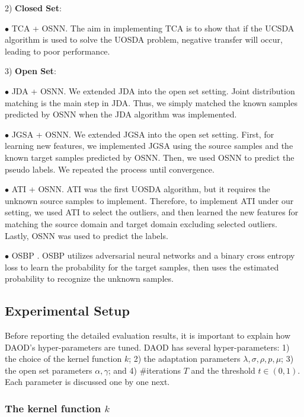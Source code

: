 \documentclass[journal]{IEEEtran}
\begin{document}
2) \textbf{Closed Set}:

$\bullet$ TCA \cite{pan2011domain} + OSNN. The aim in implementing TCA is to show that if the UCSDA algorithm is used to solve the UOSDA problem, negative transfer will occur, leading to poor performance.

3) \textbf{Open Set}:

$\bullet$ JDA \cite{long2013transfer} + OSNN. We extended JDA into the open set setting. Joint distribution matching is the main step in JDA. Thus, we simply matched the known samples predicted by OSNN when the JDA algorithm was implemented.

$\bullet$ JGSA \cite{DBLP:conf/cvpr/ZhangLO17} + OSNN. We extended JGSA into the open set setting. First, for learning new features, we implemented JGSA using the source samples and the known target samples predicted by OSNN. Then, we used OSNN to predict the pseudo labels. We repeated the process until convergence. 

$\bullet$ ATI \cite{DBLP:conf/iccv/BustoG17} + OSNN. ATI was the first UOSDA algorithm, but it requires the unknown source samples to implement. Therefore, to implement ATI under our setting, we used ATI to select the outliers, and then learned the new features for matching the source domain and target domain excluding selected outliers. Lastly, OSNN was used to predict the labels.

$\bullet$ OSBP \cite{DBLP:conf/eccv/SaitoYUH18}. OSBP utilizes adversarial neural networks and a binary cross entropy loss to learn the probability for the target samples, then uses the estimated probability to recognize the unknown samples.


\subsection{{Experimental Setup}}
Before reporting the detailed evaluation results, it is important to
explain how DAOD's hyper-parameters are tuned. DAOD has several hyper-parameters: 1) the choice
of the kernel function $k$; 2) the adaptation parameters $\lambda,\sigma,\rho,p,\mu$; 3) the open set parameters $\alpha, \gamma$; and 4) $\#$iterations $T$ and the threshold $t\in (0,1)$.  Each parameter is discussed one by one next. 

\subsubsection{{The kernel function $k$} }
\end{document}
